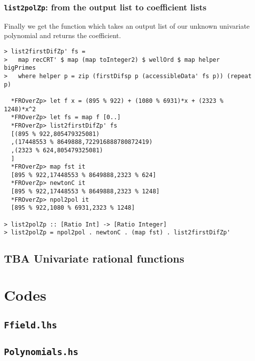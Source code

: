 \documentclass[11pt]{book}
\begin{document}
\subsection{\texttt{list2polZp}: from the output list to coefficient lists}
Finally we get the function which takes an output list of our unknown univariate polynomial and returns the coefficient.
\begin{verbatim}
> list2firstDifZp' fs = 
>   map recCRT' $ map (map toInteger2) $ wellOrd $ map helper bigPrimes
>   where helper p = zip (firstDifsp p (accessibleData' fs p)) (repeat p)

  *FROverZp> let f x = (895 % 922) + (1080 % 6931)*x + (2323 % 1248)*x^2
  *FROverZp> let fs = map f [0..]
  *FROverZp> list2firstDifZp' fs
  [(895 % 922,805479325081)
  ,(17448553 % 8649888,722916888780872419)
  ,(2323 % 624,805479325081)
  ]
  *FROverZp> map fst it
  [895 % 922,17448553 % 8649888,2323 % 624]
  *FROverZp> newtonC it
  [895 % 922,17448553 % 8649888,2323 % 1248]
  *FROverZp> npol2pol it
  [895 % 922,1080 % 6931,2323 % 1248]

> list2polZp :: [Ratio Int] -> [Ratio Integer]
> list2polZp = npol2pol . newtonC . (map fst) . list2firstDifZp'
\end{verbatim}

\section{TBA Univariate rational functions}



















\chapter{Codes}
\section{\texttt{Ffield.lhs}}


\section{\texttt{Polynomials.hs}}

\end{document}
